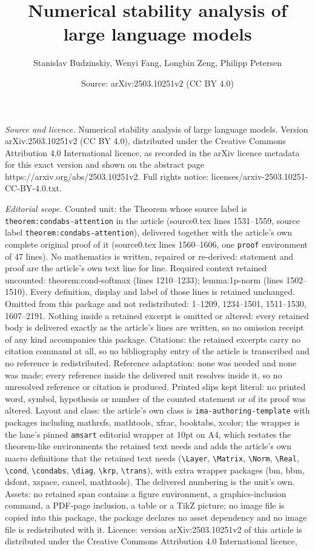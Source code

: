 \documentclass[10pt,a4paper]{amsart}
\title[Numerical stability analysis of large language models]{Numerical stability analysis of large language models}
\author{Stanislav Budzinskiy, Wenyi Fang, Longbin Zeng, Philipp Petersen}
\date{Source: arXiv:2503.10251v2 (CC BY 4.0)}
\begin{document}
\maketitle

\noindent\emph{Source and licence.} Numerical stability analysis of large language models. Version arXiv:2503.10251v2 (CC BY 4.0), distributed under the Creative Commons Attribution 4.0 International licence, as recorded in the arXiv licence metadata for this exact version and shown on the abstract page https://arxiv.org/abs/2503.10251v2. Full rights notice: licenses/arxiv-2503.10251-CC-BY-4.0.txt.\par\smallskip

\noindent\textit{Editorial scope.} Counted unit: the Theorem whose source label is \texttt{theorem:condabs-attention} in the article (source0.tex lines 1531--1559, source label \texttt{theorem:condabs-attention}), delivered together with the article's own complete original proof of it (source0.tex lines 1560--1606, one \texttt{proof} environment of 47 lines). No mathematics is written, repaired or re-derived: statement and proof are the article's own text line for line. Required context retained uncounted: theorem:cond-softmax (lines 1210--1233); lemma:1p-norm (lines 1502--1510). Every definition, display and label of those lines is retained unchanged. Omitted from this package and not redistributed: 1--1209, 1234--1501, 1511--1530, 1607--2191. Nothing inside a retained excerpt is omitted or altered: every retained body is delivered exactly as the article's lines are written, so no omission receipt of any kind accompanies this package. Citations: the retained excerpts carry no citation command at all, so no bibliography entry of the article is transcribed and no reference is redistributed. Reference adaptation: none was needed and none was made; every reference inside the delivered unit resolves inside it, so no unresolved reference or citation is produced. Printed slips kept literal: no printed word, symbol, hypothesis or number of the counted statement or of its proof was altered. Layout and class: the article's own class is \texttt{ima-authoring-template} with packages including mathrsfs, mathtools, xfrac, booktabs, xcolor; the wrapper is the lane's pinned \texttt{amsart} editorial wrapper at 10pt on A4, which restates the theorem-like environments the retained text needs and adds the article's own macro definitions that the retained text needs (\texttt{\textbackslash Layer}, \texttt{\textbackslash Matrix}, \texttt{\textbackslash Norm}, \texttt{\textbackslash Real}, \texttt{\textbackslash cond}, \texttt{\textbackslash condabs}, \texttt{\textbackslash diag}, \texttt{\textbackslash krp}, \texttt{\textbackslash trans}), with extra wrapper packages (bm, bbm, dsfont, xspace, cancel, mathtools). The delivered numbering is the unit's own. Assets: no retained span contains a figure environment, a graphics-inclusion command, a PDF-page inclusion, a table or a TikZ picture; no image file is copied into this package, the package declares no asset dependency and no image file is redistributed with it. Licence: version arXiv:2503.10251v2 of this article is distributed under the Creative Commons Attribution 4.0 International licence, 
\end{document}
